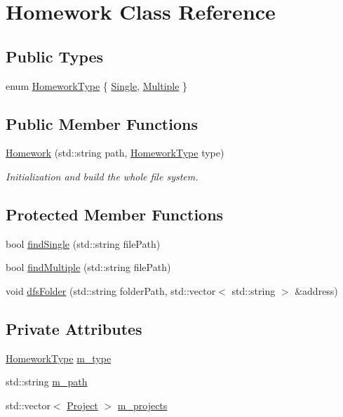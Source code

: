 \hypertarget{class_homework}{}\section{Homework Class Reference}
\label{class_homework}
\subsection*{Public Types}
\begin{DoxyCompactItemize}
\item 
enum \hyperlink{class_homework_a6509dc051b3763d7fea21b4557d3e79e}{HomeworkType} \{ \hyperlink{class_homework_a6509dc051b3763d7fea21b4557d3e79ea36e19dfd1e533060c7fe573d957186b7}{Single}, 
\hyperlink{class_homework_a6509dc051b3763d7fea21b4557d3e79ea70ece26b542060114ccdffac5e147ee9}{Multiple}
 \}
\end{DoxyCompactItemize}
\subsection*{Public Member Functions}
\begin{DoxyCompactItemize}
\item 
\hyperlink{class_homework_aff55dea2a7a6958a7c05c1e843061f81}{Homework} (std::string path, \hyperlink{class_homework_a6509dc051b3763d7fea21b4557d3e79e}{HomeworkType} type)
\begin{DoxyCompactList}\small\item\em Initialization and build the whole file system. \end{DoxyCompactList}\end{DoxyCompactItemize}
\subsection*{Protected Member Functions}
\begin{DoxyCompactItemize}
\item 
bool \hyperlink{class_homework_aab839a8b3d15dbf849b018e2295aecc2}{findSingle} (std::string filePath)
\item 
bool \hyperlink{class_homework_aef97adc1d880c7aaf5870d70b05777c0}{findMultiple} (std::string filePath)
\item 
void \hyperlink{class_homework_ae7c7babeff4d2f82b9ac0b139e92701e}{dfsFolder} (std::string folderPath, std::vector$<$ std::string $>$ \&address)
\end{DoxyCompactItemize}
\subsection*{Private Attributes}
\begin{DoxyCompactItemize}
\item 
\hyperlink{class_homework_a6509dc051b3763d7fea21b4557d3e79e}{HomeworkType} \hyperlink{class_homework_a2a684368d7bdfaa95ee102e4fa6372ba}{m\_type}
\item 
std::string \hyperlink{class_homework_acfd58f754bd1712de9903dc986dc6d1e}{m\_path}
\item 
std::vector$<$ \hyperlink{class_project}{Project} $>$ \hyperlink{class_homework_a7d9479cfebf02074e2ac340561f7fb8e}{m\_projects}
\end{DoxyCompactItemize}


